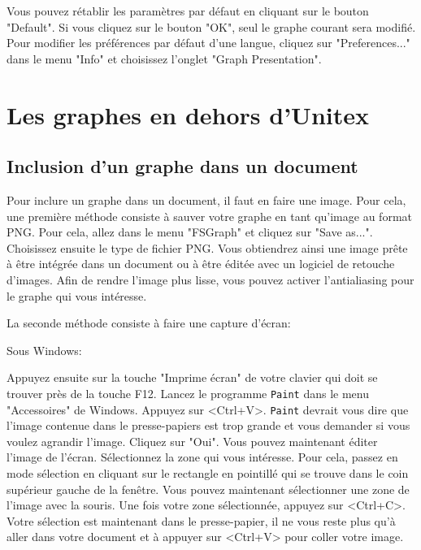 \bigskip
\noindent Vous pouvez rétablir les paramètres par défaut en cliquant sur le bouton "Default".
Si vous cliquez sur le bouton "OK", seul le graphe courant sera modifié.
Pour modifier les préférences par défaut d’une langue, cliquez sur "Preferences..." dans le
menu "Info" et choisissez l’onglet "Graph Presentation".



\section{Les graphes en dehors d’Unitex}
\subsection{Inclusion d’un graphe dans un document}
Pour inclure un graphe dans un document, il faut en faire une image. Pour cela, une
première méthode consiste à sauver votre graphe en tant qu’image au format PNG. Pour
cela, allez dans le menu "FSGraph" et cliquez sur "Save as...". Choisissez ensuite le type de
fichier PNG. Vous obtiendrez ainsi une image prête à être intégrée dans un document ou
à être éditée avec un logiciel de retouche d’images. Afin de rendre l’image plus lisse, vous
pouvez activer l’antialiasing pour le graphe qui vous intéresse.


\bigskip
\noindent La seconde méthode consiste à faire une capture d’écran:

\bigskip
\noindent Sous Windows:

\bigskip
\noindent Appuyez ensuite sur la touche "Imprime écran" de votre clavier qui doit se trouver près
de la touche F12. Lancez le programme \verb+Paint+ dans le menu "Accessoires" de Windows. Appuyez sur 
<Ctrl+V>. \verb+Paint+ devrait vous dire que l’image contenue dans le presse-papiers
est trop grande et vous demander si vous voulez agrandir l’image. Cliquez sur "Oui". Vous
pouvez maintenant éditer l’image de l’écran. Sélectionnez la zone qui vous intéresse. Pour
cela, passez en mode sélection en cliquant sur le rectangle en pointillé qui se trouve dans
le coin supérieur gauche de la fenêtre. Vous pouvez maintenant sélectionner une zone de
l’image avec la souris. Une fois votre zone sélectionnée, appuyez sur <Ctrl+C>. Votre sélection
est maintenant dans le presse-papier, il ne vous reste plus qu’à aller dans votre document
et à appuyer sur <Ctrl+V> pour coller votre image.


